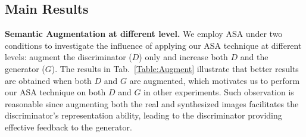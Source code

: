 \documentclass[10pt,journal,compsoc]{IEEEtran}
\begin{document}
\subsection{Main Results}
\textbf{Semantic Augmentation at different level.}
We employ ASA under two conditions to investigate the influence of applying our ASA technique at different levels: augment the discriminator ($D$) only and increase both $D$ and the generator ($G$).
The results in Tab.~\ref{Table:Augment} illustrate that better results are obtained when both $D$ and $G$ are augmented, which motivates us to perform our ASA technique on both $D$ and $G$ in other experiments.
Such observation is reasonable since augmenting both the real and synthesized images facilitates the discriminator's representation ability, leading to the discriminator providing effective feedback to the generator.
\begin{table}[htbp]
\caption{\textbf{FID({$\downarrow$}) and IS({$\uparrow$}) comparison on augmenting} neither $D$ nor $G$, augmenting $D$ only, and augmenting both $D$ and $G$.}
\label{Table:Augment}
\end{table}
\end{document}
